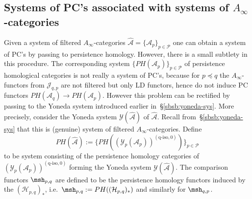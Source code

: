 \subsection{Systems of PC's associated with systems of
  $A_{\infty}$-categories} \label{sbsb:sys-ai-pc} Given a system of
filtered $A_{\infty}$-categories
$\widehat{\mathcal{A}} = \{ \mathcal{A}_p\}_{p \in \mathcal{P}}$ one
can obtain a system of PC's by passing to persistence
homology. However, there is a small subtlety in this procedure. The
corresponding system $\{PH(\mathcal{A}_p)\}_{p \in \mathcal{P}}$ of
persistence homological categories is not really a system of PC's,
because for $p \preceq q$ the $A_{\infty}$-functors from
$\mathcal{J}_{q,p}$ are not filtered but only LD functors, hence do not
induce PC functors
$PH(\mathcal{A}_q) \longrightarrow PH(\mathcal{A}_p)$. However this
problem can be rectified by passing to the Yoneda system introduced
earlier in~\S\ref{sbsb:yoneda-sys}. More precisely, consider the
Yoneda system $\mathcal{Y}(\widehat{\mathcal{A}})$ of
$\widehat{\mathcal{A}}$. Recall from~\S\ref{sbsb:yoneda-sys} that this
is (genuine) system of filtered $A_{\infty}$-categories. Define
$$PH(\widehat{\mathcal{A}}) :=
\{PH((\mathcal{Y}_p(\mathcal{A}_p))^{(\text{q-iso},0)})\}_{p \in
  \mathcal{P}}$$ to be system consisting of the persistence homology
categories of $(\mathcal{Y}_p(\mathcal{A}_p))^{(\text{q-iso},0)}$
forming the Yoneda system $\mathcal{Y}(\widehat{\mathcal{A}})$. The
comparison functors $\msh_{p,q}$ are defined to be the persistence
homology functors induced by the $(\mathcal{H}_{p,q})_*$,
i.e.~$\msh_{p,q} := PH((\mathcal{H}_{p,q})_*)$ and similarly for
$\msh_{q,p}$.
  



